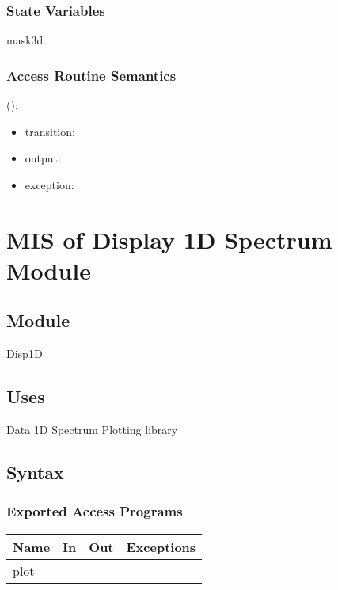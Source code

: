 \documentclass[12pt, titlepage]{article}
\begin{document}
\subsubsection{State Variables}
mask3d

\subsubsection{Access Routine Semantics}

\noindent {}():
\begin{itemize}
\item transition:  
\item output:  
\item exception:  
\end{itemize}

\section{MIS of Display 1D Spectrum Module} \label{Mod:Disp1D} 

\subsection{Module}

Disp1D

\subsection{Uses}
Data 1D Spectrum
Plotting library

\subsection{Syntax}

\subsubsection{Exported Access Programs}

\begin{center}
\begin{tabular}{p{2cm} p{4cm} p{4cm} p{2cm}}
\hline
\textbf{Name} & \textbf{In} & \textbf{Out} & \textbf{Exceptions} \\
\hline
plot & - & - & - \\
\hline
\end{tabular}
\end{center}
\end{document}

